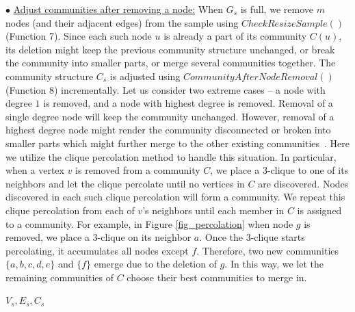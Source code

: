 \noindent$\bullet$ \underline{Adjust communities after removing a node:} When $G_s$ is full, we remove $m$ nodes (and their adjacent edges) from the sample using $CheckResizeSample()$ (Function 7). Since each such node $u$ is already a part of its community $C(u)$, its deletion might keep the previous community structure unchanged, or break the community into smaller parts, or merge several communities together. The community structure $C_s$ is adjusted using  $CommunityAfterNodeRemoval()$ (Function 8) incrementally.  Let us consider two extreme cases -- a node with degree $1$ is removed, and a node with highest degree is removed. Removal of a single degree node will keep the community unchanged. However, removal of a highest degree node might render the community disconnected 
or broken into smaller parts which might further merge to the other existing communities~\cite{pone.0091431}. Here we utilize the clique percolation method \cite{PalEtAl05} to handle this situation. In particular, when a vertex $v$ is removed from a community $C$, we place a 3-clique to one of its neighbors and let the clique percolate until no vertices in $C$ are discovered. Nodes discovered in each such clique percolation will form a community. We repeat this clique percolation from each of $v$'s neighbors until each member in $C$ is assigned to a community. For example, in Figure \ref{fig_percolation} when node $g$ is removed, we place a 3-clique on its neighbor $a$. Once the 3-clique starts percolating, it accumulates all nodes except $f$. Therefore, two new communities $\{a,b,c,d,e\}$ and $\{f\}$  emerge due to the deletion of $g$. In this way, we let the remaining communities of $C$ choose their best communities to merge in. %

\begin{function7}
\caption{\small$CheckResizeSample(V_s,C_s,n,m)$}
\Return $V_s,E_s,C_s$
\end{function7}


